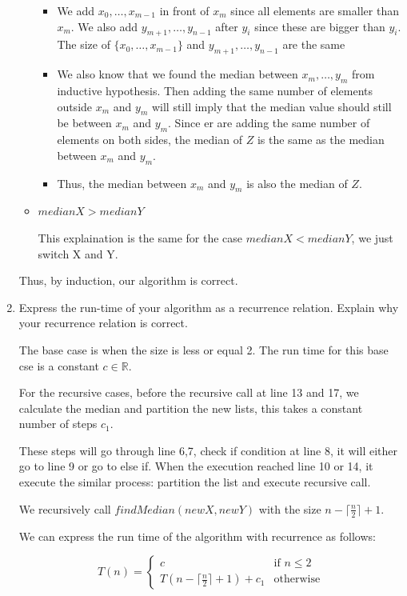 \documentclass{cpsc413Solutions}
\begin{document}
\begin{problemlist}
\begin{problem}
\begin{enumerate}
\begin{itemize}
\begin{itemize}
        \item We add $x_0, \dots, x_{m-1}$ in front of $x_m$ since all elements are smaller than $x_m$. We also add $y_{m+1}, \dots, y_{n-1}$ after $y_i$ since these are bigger than $y_i$. The size of $\{x_0, \dots, x_{m-1} \}$ and $y_{m+1}, \dots, y_{n-1}$ are the same
        
        \item We also know that we found the median between $x_m, \dots, y_m$ from inductive hypothesis. Then adding the same number of elements outside $x_m$ and $y_m$ will still imply that the median value should still be between $x_m$ and $y_m$. Since er are adding the same number of elements on both sides, the median of $Z$ is the same as the median between $x_m$ and $y_m$.
        
        \item Thus, the median between $x_m$ and $y_m$ is also the median of $Z$.
    \end{itemize}
    
    \item $medianX>medianY$
    
    This explaination is the same for the case $medianX < medianY$, we just switch X and Y.
    
    \end{itemize}
Thus, by induction, our algorithm is correct.

\newpage
\item Express the run-time of your algorithm as a recurrence relation.  Explain why your recurrence relation is correct.

The base case is when the size is less or equal 2. The run time for this base cse is a constant $c \in \mathds{R}$.

For the recursive cases, before the recursive call at line 13 and 17, we calculate the median and partition the new lists, this takes a constant number of steps $c_1$. 

These steps will go through line 6,7, check if condition at line 8, it will either go to line 9 or go to else if. When the execution reached line 10 or 14, it execute the similar process: partition the list and execute recursive call.

We recursively call $findMedian(newX,newY)$ with the size $n- \lceil \frac{n}{2} \rceil +1$.

We can express the run time of the algorithm with recurrence as follows:

\[
T(n) =
\begin{cases}
c & \text{if $n \le 2$}\\
T(n - \lceil \frac{n}{2}\rceil + 1) + c_1 & \text{otherwise}
\end{cases}
\]


\end{enumerate}
\end{problem}
\end{problemlist}
\end{document}
